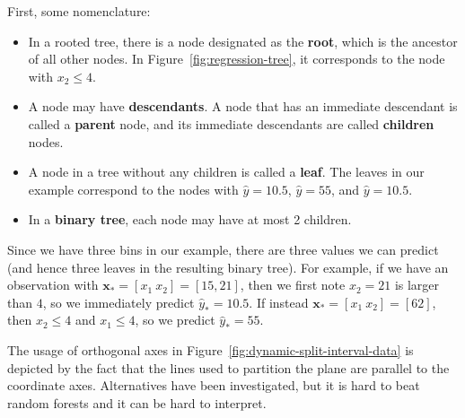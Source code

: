 \documentclass[12pt, a4paper]{article}
\theoremstyle{definition}
\begin{document}
	First, some nomenclature:
	\begin{itemize}
		\item In a rooted tree, there is a node designated as the \textbf{root},
		which is the ancestor of all other nodes. In Figure~\ref{fig:regression-tree},
		it corresponds to the node with $x_2 \leq 4$.
		\item A node may have \textbf{descendants}. A node that has an immediate
		descendant is called a \textbf{parent} node, and its immediate descendants
		are called \textbf{children} nodes.
		\item A node in a tree without any children is called a \textbf{leaf}.
		The leaves in our example correspond to the nodes with $\hat{y}=10.5$, $\hat{y}=55$,
		and $\hat{y}=10.5$.
		\item In a \textbf{binary tree}, each node may have at most 2 children.
	\end{itemize}
	Since we have three bins in our example, there are three values we can predict
	(and hence three leaves in the resulting binary tree). For example,
	if we have an observation with $\bm{x}_* = [x_1 \ x_2] = [15, 21]$, then we first
	note $x_2=21$ is larger than $4$, so we immediately predict $\hat{y}_* = 10.5$.
	If instead $\bm{x}_* = [x_1 \  x_2] = [6 2]$, then $x_2\leq 4$ and $x_1\leq 4$,
	so we predict $\hat{y}_* = 55$.
	
	The usage of orthogonal axes in Figure~\ref{fig:dynamic-split-interval-data}
	is depicted by the fact that the lines used to partition the plane are parallel
	to the coordinate axes. Alternatives have been investigated, but it is hard
	to beat random forests and it can be hard to interpret.
	
\end{document}
